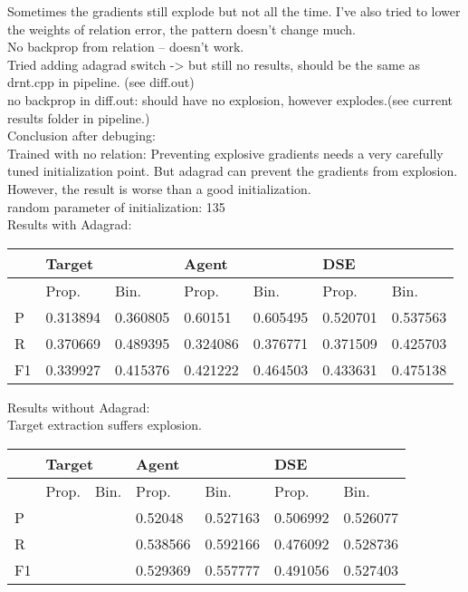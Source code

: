 \documentclass[a4paper, 12pt]{article}
\begin{document}
Sometimes the gradients still explode but not all the time. I've also tried to lower the weights of relation error, the pattern doesn't change much.\\

No backprop from relation -- doesn't work.\\
Tried adding adagrad switch -> but still no results, should be the same as
drnt.cpp in pipeline. (see diff.out) \\
no backprop in diff.out: should have no explosion, however explodes.(see
current results folder in pipeline.)\\

Conclusion after debuging:\\
Trained with no relation:
Preventing explosive gradients needs a very carefully tuned initialization
point. But adagrad can prevent the gradients from explosion. However, the
result is worse than a good initialization.\\
random parameter of initialization: 135\\
Results with Adagrad:\\
\begin{table}[h!]
\centering
\begin{tabular}{l|ll|ll|ll}
\hline
   & \multicolumn{2}{l}{Target} & \multicolumn{2}{l}{Agent} & \multicolumn{2}{l}{DSE} \\ \hline
   & Prop.& Bin.& Prop.& Bin.& Prop.& Bin.\\
 \hline
P  &0.313894&0.360805 & 0.60151 & 0.605495 &0.520701 & 0.537563  \\
R  &0.370669&0.489395 &0.324086 & 0.376771 &0.371509 & 0.425703  \\
F1 &0.339927&0.415376 &0.421222 & 0.464503 &0.433631 & 0.475138  \\ \hline
\end{tabular}
\end{table}

Results without Adagrad:\\

Target extraction suffers explosion.

\begin{table}[h!]
\centering
\begin{tabular}{l|ll|ll|ll}
\hline
   & \multicolumn{2}{l}{Target} & \multicolumn{2}{l}{Agent} & \multicolumn{2}{l}{DSE} \\ \hline
   & Prop.& Bin.& Prop.& Bin.& Prop.& Bin.\\
 \hline
P  && & 0.52048  & 0.527163  &0.506992 &  0.526077  \\
R  && & 0.538566 &  0.592166 &0.476092 &  0.528736  \\
F1 && & 0.529369 &  0.557777 &0.491056 &  0.527403  \\ \hline
\end{tabular}
\end{table}
\end{document}
